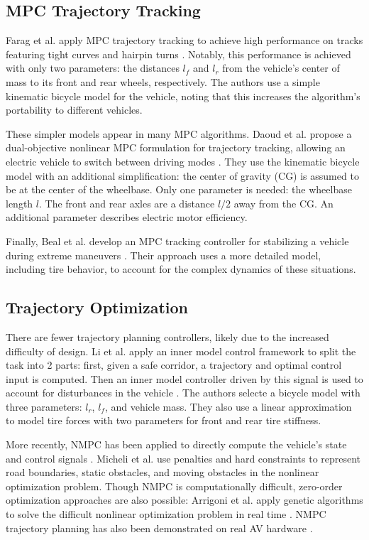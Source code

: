 \documentclass[letterpaper, 10 pt, conference]{ieeeconf}  %
\begin{document}
\subsection{MPC Trajectory Tracking}
Farag et al. apply MPC trajectory tracking to achieve high performance on tracks featuring tight curves and hairpin turns \cite{farag}. Notably, this performance is achieved with only two parameters: the distances $l_f$ and $l_r$ from the vehicle's center of mass to its front and rear wheels, respectively. The authors use a simple kinematic bicycle model for the vehicle, noting that this increases the algorithm's portability to different vehicles.

These simpler models appear in many MPC algorithms. Daoud et al. propose  a dual-objective nonlinear MPC formulation for trajectory tracking, allowing an electric vehicle to switch between driving modes \cite{pathfollowingMPC}. They use the kinematic bicycle model with an additional simplification: the center of gravity (CG) is assumed to be at the center of the wheelbase. Only one parameter is needed: the wheelbase length $l$. The front and rear axles are a distance $l/2$ away from the CG. An additional parameter describes electric motor efficiency. 

Finally, Beal et al. develop an MPC tracking controller for stabilizing a vehicle during extreme maneuvers \cite{beal}. Their approach uses a more detailed model, including tire behavior, to account for the complex dynamics of these situations.

\subsection{Trajectory Optimization}

There are fewer trajectory planning controllers, likely due to the increased difficulty of design. Li et al. apply an inner model control framework to split the task into 2 parts: first, given a safe corridor, a trajectory and optimal control input is computed. Then an inner model controller driven by this signal is used to account for disturbances in the vehicle \cite{pathtracking}. The authors selecte a bicycle model with three parameters: $l_r$, $l_f$, and vehicle mass. They also use a linear approximation to model tire forces with two parameters for front and rear tire stiffness.

More recently, NMPC has been applied to directly compute the vehicle's state and control signals \cite{nmpc_micheli}. Micheli et al. use penalties and hard constraints to represent road boundaries, static obstacles, and moving obstacles in the nonlinear optimization problem.
Though NMPC is computationally difficult, zero-order optimization approaches are also possible: Arrigoni et al. apply genetic algorithms to solve the difficult nonlinear optimization problem in real time \cite{arrigoni2021mpc}. NMPC trajectory planning has also been demonstrated on real AV hardware \cite{nmpc_platform}.
\end{document}
